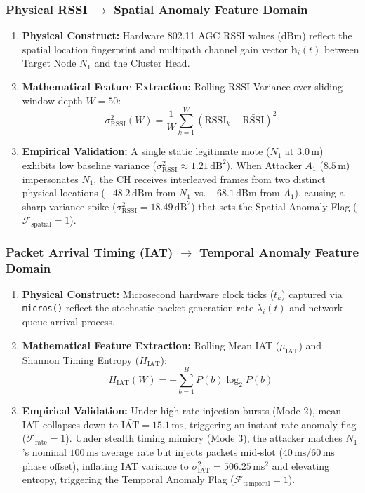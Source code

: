 \subsubsection{Physical RSSI $\to$ Spatial Anomaly Feature Domain}
\begin{enumerate}
    \item \textbf{Physical Construct:} Hardware 802.11 AGC RSSI values ($\text{dBm}$) reflect the spatial location fingerprint and multipath channel gain vector $\mathbf{h}_i(t)$ between Target Node $N_1$ and the Cluster Head.
    \item \textbf{Mathematical Feature Extraction:} Rolling RSSI Variance over sliding window depth $W=50$:
    \begin{equation}
        \sigma^2_{\text{RSSI}}(W) = \frac{1}{W} \sum_{k=1}^{W} (\text{RSSI}_k - \bar{\text{RSSI}})^2
    \end{equation}
    \item \textbf{Empirical Validation:} A single static legitimate mote ($N_1$ at $3.0\,\text{m}$) exhibits low baseline variance ($\sigma^2_{\text{RSSI}} \approx 1.21\,\text{dB}^2$). When Attacker $A_1$ ($8.5\,\text{m}$) impersonates $N_1$, the CH receives interleaved frames from two distinct physical locations ($-48.2\,\text{dBm}$ from $N_1$ vs. $-68.1\,\text{dBm}$ from $A_1$), causing a sharp variance spike ($\sigma^2_{\text{RSSI}} = 18.49\,\text{dB}^2$) that sets the Spatial Anomaly Flag ($\mathcal{F}_{\text{spatial}} = 1$).
\end{enumerate}

\subsubsection{Packet Arrival Timing (IAT) $\to$ Temporal Anomaly Feature Domain}
\begin{enumerate}
    \item \textbf{Physical Construct:} Microsecond hardware clock ticks ($t_k$) captured via \texttt{micros()} reflect the stochastic packet generation rate $\lambda_i(t)$ and network queue arrival process.
    \item \textbf{Mathematical Feature Extraction:} Rolling Mean IAT ($\mu_{\text{IAT}}$) and Shannon Timing Entropy ($H_{\text{IAT}}$):
    \begin{equation}
        H_{\text{IAT}}(W) = -\sum_{b=1}^{B} P(b) \log_2 P(b)
    \end{equation}
    \item \textbf{Empirical Validation:} Under high-rate injection bursts (Mode 2), mean IAT collapses down to $\bar{\text{IAT}} = 15.1\,\text{ms}$, triggering an instant rate-anomaly flag ($\mathcal{F}_{\text{rate}} = 1$). Under stealth timing mimicry (Mode 3), the attacker matches $N_1$'s nominal $100\,\text{ms}$ average rate but injects packets mid-slot ($40\,\text{ms} / 60\,\text{ms}$ phase offset), inflating IAT variance to $\sigma^2_{\text{IAT}} = 506.25\,\text{ms}^2$ and elevating entropy, triggering the Temporal Anomaly Flag ($\mathcal{F}_{\text{temporal}} = 1$).
\end{enumerate}

